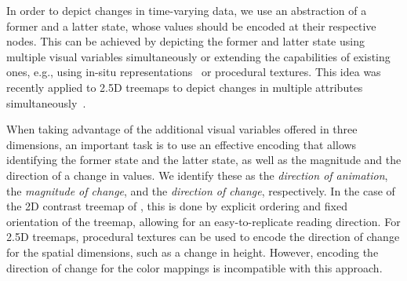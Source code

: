 \documentclass[smallextended,natbib]{svjour3}       %
\begin{document}
In order to depict changes in time-varying data,
we use an abstraction of a former and a latter state, whose values should be encoded at their respective nodes.
This can be achieved by depicting the former and latter state using multiple visual variables simultaneously or extending the capabilities of existing ones, e.g., using in-situ representations~\citep{tu2007-changes} or procedural textures.
This idea was recently applied to 2.5D treemaps to depict changes in multiple attributes simultaneously~\citep{limberger2019-insitu}.

When taking advantage of the additional visual variables offered in three dimensions, an important task is to use an effective encoding that allows identifying the former state and the latter state, as well as the magnitude and the direction of a change in values.
We identify these as the \emph{direction of animation}, the \emph{magnitude of change}, and the \emph{direction of change}, respectively.
In the case of the 2D contrast treemap of \citeauthor{tu2007-changes}, this is done by explicit ordering and fixed orientation of the treemap, allowing for an easy-to-replicate reading direction.
For 2.5D treemaps, procedural textures can be used to encode the direction of change for the spatial dimensions, such as a change in height.
However, encoding the direction of change for the color mappings is incompatible with this approach.
\end{document}
